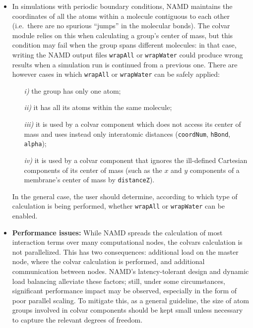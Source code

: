 \begin{itemize}

\item In simulations with periodic boundary conditions, NAMD maintains
  the coordinates of all the atoms within a molecule contiguous to
  each other (i.e.~there are no spurious ``jumps'' in the molecular
  bonds).  The colvar module relies on this when calculating a group's
  center of mass, but this condition may fail when the group spans
  different molecules: in that case, writing the NAMD output files
  \texttt{wrapAll} or \texttt{wrapWater} could produce wrong results
  when a simulation run is continued from a previous one.  There are
  however cases in which \texttt{wrapAll} or \texttt{wrapWater} can be
  safely applied:
  \begin{enumerate}
  \item[\emph{i)}] the group has only one atom;
  \item[\emph{ii)}] it has all its atoms within the same molecule;
  \item[\emph{iii)}] it is used by a colvar component which does not
    access its center of mass and uses instead only interatomic
    distances (\texttt{coordNum}, \texttt{hBond}, \texttt{alpha});
  \item[\emph{iv)}] it is used by a colvar component that ignores the
    ill-defined Cartesian components of its center of mass (such as
    the $x$ and $y$ components of a membrane's center of mass by
    \texttt{distanceZ}).
  \end{enumerate}    
  In the general case, the user should determine, according to which
  type of calculation is being performed, whether \texttt{wrapAll} or
  \texttt{wrapWater} can be enabled.

\item \textbf{Performance issues:}
  While NAMD spreads the calculation of most interaction terms
  over many computational nodes, the colvars calculation is not
  parallelized. This has two consequences: additional load on the
  master node, where the colvar calculation is performed, and
  additional communication between nodes.
  NAMD's latency-tolerant design and dynamic load balancing
  alleviate these factors; still, under some circumstances, 
  significant performance impact may be observed, especially in
  the form of poor parallel scaling. To mitigate
  this, as a general guideline, the size of atom groups
  involved in colvar components should be kept small unless
  necessary to capture the relevant degrees of freedom. 

\end{itemize}



